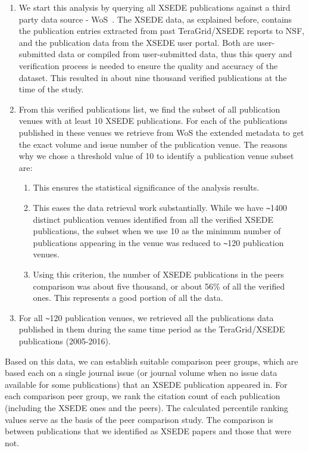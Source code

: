\documentclass{sig-alternate}
\begin{document}
\begin{enumerate}
\item We start this analysis by querying all XSEDE publications
  against a third party data source - WoS~\cite{www-isiwos}. The XSEDE
  data, as explained before, contains the publication entries
  extracted from past TeraGrid/XSEDE reports to NSF, and the
  publication data from the XSEDE user portal. Both are user-submitted
  data or compiled from user-submitted data, thus this query and
  verification process is needed to ensure the quality and accuracy of
  the dataset.  This resulted in about nine thousand verified
  publications at the time of the study.

\item From this verified publications list, we find the subset of all
  publication venues with at least 10 XSEDE publications. For each of
  the publications published in these venues we retrieve from WoS the
  extended metadata to get the exact volume and issue number of the
  publication venue. The reasons why we chose a threshold value of 10
  to identify a publication venue subset are:

  \begin{enumerate}
  \item This ensures the statistical significance of the analysis
    results.
  \item This eases the data retrieval work substantially. While we
    have \verb|~|1400 distinct publication venues identified from all the
    verified XSEDE publications, the subset when we use 10 as the
    minimum number of publications appearing in the venue was reduced
    to \verb|~|120 publication venues.
  \item Using this criterion, the number of XSEDE publications in the
    peers comparison was about five thousand, or about 56\% of all the
    verified ones. This represents a good portion of all the data.
  \end{enumerate}

\item For all \verb|~|120 publication venues, we retrieved all the
  publications data published in them during the same time period as
  the TeraGrid/XSEDE publications (2005-2016).
\end{enumerate}

Based on this data, we can establish suitable comparison peer groups,
which are based each on a single journal issue (or journal volume when
no issue data available for some publications) that an XSEDE
publication appeared in. For each comparison peer group, we rank the
citation count of each publication (including the XSEDE ones and the
peers). The calculated percentile ranking values serve as the basis of
the peer comparison study. The comparison is between publications that
we identified as XSEDE papers and those that were not.
\end{document}
